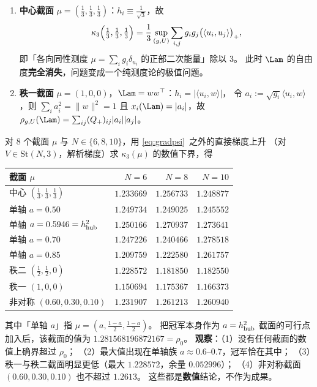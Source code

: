 \begin{corollary}[两个特殊截面的显式形式]\label{cor:sectspecial}
\begin{enumerate}\itemsep3pt
\item[(i)] \textbf{中心截面} $\mu=(\frac13,\frac13,\frac13)$：$h_i\equiv\frac1{\sqrt3}$，故
\begin{equation}\label{eq:center}
\kappa_3\Bigl(\tfrac13,\tfrac13,\tfrac13\Bigr)=\frac13\sup_{(g,U)}\sum_{i,j}g_ig_j\bigl(\langle u_i,u_j\rangle\bigr)_+ ,
\end{equation}
即「各向同性测度 $\mu=\sum_ig_i\delta_{u_i}$ 的正部二次能量」除以 $3$。
此时 $\Lam$ 的自由度\textbf{完全消失}，问题变成一个纯测度论的极值问题。
\item[(ii)] \textbf{秩一截面} $\mu=(1,0,0)$，$\Lam=ww^\top$：$h_i=|\langle u_i,w\rangle|$，
令 $a_i:=\sqrt{g_i}\langle u_i,w\rangle$，则 $\sum_ia_i^2=\|w\|^2=1$ 且 $x_i(\Lam)=|a_i|$，故
$\rho_{g,U}(\Lam)=\sum_{ij}(Q_+)_{ij}|a_i||a_j|$。
\end{enumerate}
\end{corollary}

\begin{proposition}[截面地图，数值]\label{prop:sectmap}
对 $8$ 个截面 $\mu$ 与 $N\in\{6,8,10\}$，用 \eqref{eq:gradpsi}~之外的直接梯度上升
（对 $V\in\mathrm{St}(N,3)$，解析梯度）求 $\kappa_3(\mu)$ 的数值下界，得
\begin{center}\small
\begin{tabular}{lrrr}
\toprule
截面 $\mu$ & $N=6$ & $N=8$ & $N=10$ \\
\midrule
中心 $(\frac13,\frac13,\frac13)$ & $1.233669$ & $1.256733$ & $1.248877$ \\
单轴 $a=0.50$ & $1.249734$ & $1.249025$ & $1.245552$ \\
单轴 $a=0.5946=h_{\rm hub}^2$ & $1.250166$ & $1.270937$ & $1.273641$ \\
单轴 $a=0.70$ & $1.247226$ & $1.240466$ & $1.278518$ \\
单轴 $a=0.85$ & $1.209759$ & $1.222580$ & $1.261757$ \\
秩二 $(\frac12,\frac12,0)$ & $1.228572$ & $1.181850$ & $1.182550$ \\
秩一 $(1,0,0)$ & $1.150694$ & $1.175367$ & $1.166373$ \\
非对称 $(0.60,0.30,0.10)$ & $1.231907$ & $1.261213$ & $1.260940$ \\
\bottomrule
\end{tabular}
\end{center}
其中「单轴 $a$」指 $\mu=(a,\frac{1-a}2,\frac{1-a}2)$。
把冠军本身作为 $a=h_{\rm hub}^2$ 截面的可行点加入后，该截面的值为 $1.281568196872167=\rho_0$。
\textbf{观察}：（1）没有任何截面的数值上确界超过 $\rho_0$；
（2）最大值出现在单轴族 $a\approx0.6$--$0.7$，冠军恰在其中；
（3）秩一与秩二截面明显更低（最大 $1.228572$，余量 $0.052996$）；
（4）非对称截面 $(0.60,0.30,0.10)$ 也不超过 $1.2613$。
这些都是\textbf{数值}结论，不作为成果。
\end{proposition}

